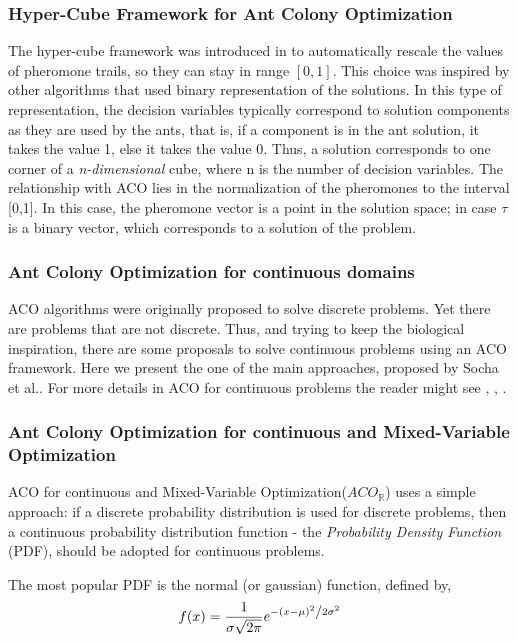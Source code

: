 					\subsubsection*{Hyper-Cube Framework for Ant Colony Optimization}
					The hyper-cube framework was introduced in \cite{blum01} to automatically rescale the values of pheromone trails, so they can stay in range $[0,1]$. This choice was inspired by other algorithms that used binary representation of the solutions. In this type of representation, the decision variables typically correspond to solution components as they are used by the ants, that is, if a component is in the ant solution, it takes the value 1, else it takes the value 0. Thus, a solution corresponds to one corner of a \emph{n-dimensional} cube, where n is the number of decision variables.
					The relationship with ACO lies in the normalization of the pheromones to the interval [0,1]. In this case, the pheromone vector is a point in the solution space; in case $\tau$ is a binary vector, which corresponds to a solution of the problem.
					
					\subsubsection*{Ant Colony Optimization for continuous domains}
					ACO algorithms were originally proposed to solve discrete problems. Yet there are problems that are not discrete. Thus, and trying to keep the biological inspiration, there are some proposals to solve continuous problems using an ACO framework. 
					Here we present the one of the main approaches, proposed by Socha et al.\cite{socha04}. For more details in ACO for continuous problems the reader might see \cite{bilchev95}, \cite{tsutsui04}, \cite{kong06}.
					
					
					\subsubsection*{Ant Colony Optimization for continuous and Mixed-Variable Optimization}
					 ACO for continuous and Mixed-Variable Optimization($ACO_\mathbb{R}$) uses a simple approach: if a discrete probability distribution is used for discrete problems, then a continuous probability distribution function - the \emph{Probability Density Function} (PDF), should be adopted for continuous problems.

					The most popular PDF is the normal (or gaussian) function, defined by,
						\begin{equation}
							f(x) = \frac{1}{{\sigma \sqrt {2\pi } }}e^{{{ - \left( {x - \mu } \right)^2 } \mathord{\left/ 				{\vphantom {{ - \left( {x - \mu } \right)^2 } {2\sigma ^2 }}} \right. \kern-\nulldelimiterspace} {2\sigma ^2 }}}
						\end{equation}


